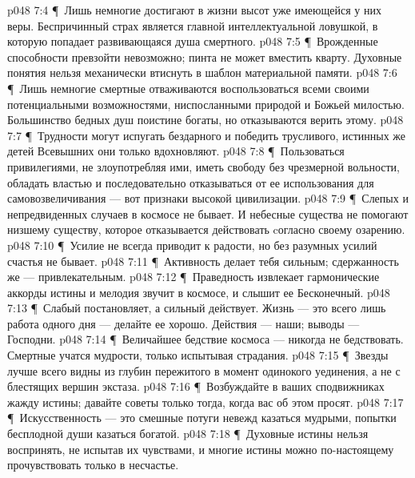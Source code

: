 \vs p048 7:4 \P\ \bibnobreakspace Лишь немногие достигают в жизни высот уже имеющейся у них веры. Беспричинный страх является главной интеллектуальной ловушкой, в которую попадает развивающаяся душа смертного.
\vs p048 7:5 \P\ \bibnobreakspace Врожденные способности превзойти невозможно; пинта не может вместить кварту. Духовные понятия нельзя механически втиснуть в шаблон материальной памяти.
\vs p048 7:6 \P\ \bibnobreakspace Лишь немногие смертные отваживаются воспользоваться всеми своими потенциальными возможностями, ниспосланными природой и Божьей милостью. Большинство бедных душ поистине богаты, но отказываются верить этому.
\vs p048 7:7 \P\ \bibnobreakspace Трудности могут испугать бездарного и победить трусливого, истинных же детей Всевышних они только вдохновляют.
\vs p048 7:8 \P\ \bibnobreakspace Пользоваться привилегиями, не злоупотребляя ими, иметь свободу без чрезмерной вольности, обладать властью и последовательно отказываться от ее использования для самовозвеличивания --- вот признаки высокой цивилизации.
\vs p048 7:9 \P\ \bibnobreakspace Слепых и непредвиденных случаев в космосе не бывает. И небесные существа не помогают низшему существу, которое отказывается действовать cогласно своему озарению.
\vs p048 7:10 \P\ \bibnobreakspace Усилие не всегда приводит к радости, но без разумных усилий счастья не бывает.
\vs p048 7:11 \P\ \bibnobreakspace Активность делает тебя сильным; сдержанность же --- привлекательным.
\vs p048 7:12 \P\ \bibnobreakspace Праведность извлекает гармонические аккорды истины и мелодия звучит в космосе, и слышит ее Бесконечный.
\vs p048 7:13 \P\ \bibnobreakspace Слабый постановляет, а сильный действует. Жизнь --- это всего лишь работа одного дня --- делайте ее хорошо. Действия --- наши; выводы --- Господни.
\vs p048 7:14 \P\ \bibnobreakspace Величайшее бедствие космоса --- никогда не бедствовать. Смертные учатся мудрости, только испытывая страдания.
\vs p048 7:15 \P\ \bibnobreakspace Звезды лучше всего видны из глубин пережитого в момент одинокого уединения, а не с блестящих вершин экстаза.
\vs p048 7:16 \P\ \bibnobreakspace Возбуждайте в ваших сподвижниках жажду истины; давайте советы только тогда, когда вас об этом просят.
\vs p048 7:17 \P\ \bibnobreakspace Искусственность --- это смешные потуги невежд казаться мудрыми, попытки бесплодной души казаться богатой.
\vs p048 7:18 \P\ \bibnobreakspace Духовные истины нельзя воспринять, не испытав их чувствами, и многие истины можно по\hyp{}настоящему прочувствовать только в несчастье.
